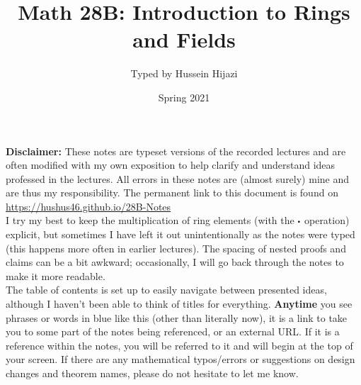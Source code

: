 \documentclass[../Main.tex]{subfiles}
\begin{document}
\title{\textbf {Math 28B: Introduction to Rings and Fields} }
\author{Typed by Hussein Hijazi}
\date{Spring 2021}
\begin{minipage}{\textwidth}
\maketitle
\textbf{Disclaimer:} These notes are typeset versions of the recorded lectures and are often modified with my own exposition to help clarify and understand ideas professed in the lectures. All errors in these notes are (almost surely) mine and are thus my responsibility. The permanent link to this document is found on \href{https://hushus46.github.io/28B-Notes/}{https://hushus46.github.io/28B-Notes}\\

I try my best to keep the multiplication of ring elements (with the $\rdot $ operation) explicit, but sometimes I have left it out unintentionally as the notes were typed (this happens more often in earlier lectures). The spacing of nested proofs and claims can be a bit awkward; occasionally, I will go back through the notes to make it more readable.\\

The table of contents is set up to easily navigate between presented ideas, although I haven't been able to think of titles for everything. \textbf{Anytime} you see phrases or words in {\color{blue}blue like this} (other than literally now), it is a link to take you to some part of the notes being referenced, or an external URL. If it is a reference within the notes, you will be referred to it and will begin at the top of your screen. If there are any mathematical typos/errors or suggestions on design changes and theorem names, please do not hesitate to let me know.
\end{minipage}
\end{document}
